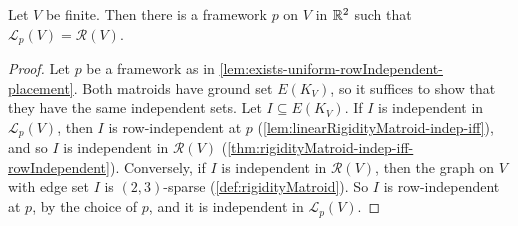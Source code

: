 \begin{theorem}
  \label{thm:linearRigidityMatroid-eq-rigidityMatroid}
  \leanok
  Let $V$ be finite. Then there is a framework $p$ on $V$ in ${\mathbb{R}}^{2}$
  such that $\mathcal{L}_p(V) = \mathcal{R}(V)$.
\end{theorem}
\begin{proof}
  \leanok
  Let $p$ be a framework as in
  \cref{lem:exists-uniform-rowIndependent-placement}. Both matroids have
  ground set $E(K_V)$, so it suffices to show that they have the same
  independent sets. Let $I \subseteq E(K_V)$. If $I$ is independent in
  $\mathcal{L}_p(V)$, then $I$ is row-independent at $p$
  (\cref{lem:linearRigidityMatroid-indep-iff}), and so $I$ is
  independent in $\mathcal{R}(V)$
  (\cref{thm:rigidityMatroid-indep-iff-rowIndependent}). Conversely, if
  $I$ is independent in $\mathcal{R}(V)$, then the graph on $V$ with
  edge set $I$ is $(2, 3)$-sparse (\cref{def:rigidityMatroid}). So $I$
  is row-independent at $p$, by the choice of $p$, and it is
  independent in $\mathcal{L}_p(V)$.
\end{proof}
